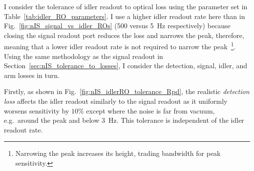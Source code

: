 I consider the tolerance of idler readout to optical loss using the parameter set in Table~\ref{tab:idler_RO_parameters}. I use a higher idler readout rate here than in Fig.~\ref{fig:nIS_signal_vs_idler_ROs} (500 versus 5~Hz respectively) because closing the signal readout port reduces the loss and narrows the peak, therefore, meaning that a lower idler readout rate is not required to narrow the peak~\footnote{Narrowing the peak increases its height, trading bandwidth for peak sensitivity.}. %
Using the same methodology as the signal readout in Section~\ref{sec:nIS_tolerance_to_losses}, I consider the detection, signal, idler, and arm losses in turn.

Firstly, as shown in Fig.~\ref{fig:nIS_idlerRO_tolerance_Rpd}, the realistic \emph{detection loss} affects the idler readout similarly to the signal readout as it uniformly worsens sensitivity by $10\%$ except where the noise is far from vacuum, e.g.\ around the peak and below 3~Hz. %
This tolerance is independent of the idler readout rate. %

